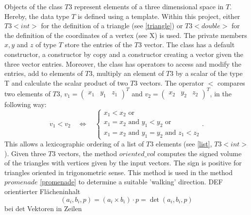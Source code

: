 \documentclass[10pt]{article}
\begin{document}
Objects of the class $T3$ represent elements of a three dimensional space in $T$. Hereby, the data type $T$ is defined using a template. Within this project, either $T3<int>$ for the definition of a triangle (see \ref{triangle}) or $T3<double>$ for the definition of the coordinates of a vertex (see X) is used. The private members $x,y$ and $z$ of type $T$ store the entries of the $T3$ vector. The class has a default constructor, a constructor by copy and a constructor creating a vector given the three vector entries. Moreover, the class has operators to access and modify the entries, add to elements of $T3$, multiply an element of $T3$ by a scalar of the type T and calculate the scalar product of two $T3$ vectors. The operator $<$ compares two elements of $T3$, $v_1 = \begin{pmatrix} x_1 & y_1 & z_1 \end{pmatrix}^T$ and $v_2 = \begin{pmatrix} x_2 & y_2 & z_2 \end{pmatrix}^T$, in the following way:
$$ v_1 < v_2 \quad \Leftrightarrow \quad \begin{cases}
 x_1 < x_2 \text{ or }\\
 x_1 = x_2 \text{ and } y_1 < y_2 \text{ or }\\
 x_1 = x_2 \text{ and } y_1 = y_2 \text{ and } z_1 < z_2
\end{cases}. $$ 
This allows a lexicographic ordering of a list of $T3$ elements (see \ref{list}, $T3<int>$). Given three $T3$ vectors, the method $ oriented\_vol $ computes the signed volume of the triangles with vertices given by the input vectors. The sign is positive for triangles oriented in trigonometric sense. This method is used in the method $promenade$ \ref{promenade} to determine a suitable 'walking' direction. DEF \\

orientierter Flächeninhalt
$$ (a_i,b_i,p) = (a_i \times b_i ) \cdot p = \det(a_i,b_i,p) $$
bei det Vektoren in Zeilen
\end{document}
